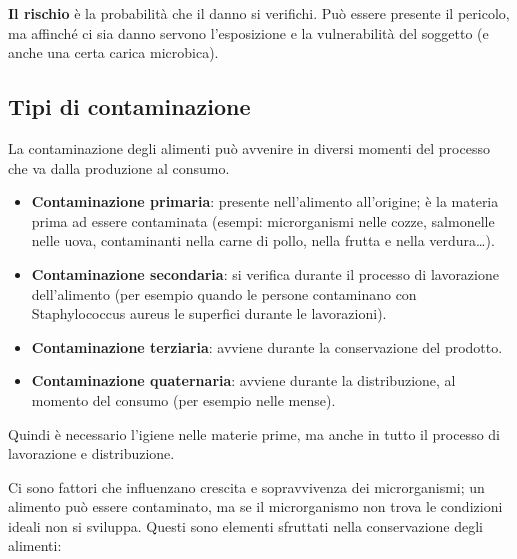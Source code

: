 \textbf{Il rischio} è la probabilità che il danno si verifichi. Può
essere presente il pericolo, ma affinché ci sia danno servono
l'esposizione e la vulnerabilità del soggetto (e anche una certa carica
microbica).

\subsection{Tipi di contaminazione}

La contaminazione degli alimenti può avvenire in diversi momenti del
processo che va dalla produzione al consumo.

\begin{itemize}
\item
  \textbf{Contaminazione primaria}: presente nell'alimento all'origine;
  è la materia prima ad essere contaminata (esempi: microrganismi nelle
  cozze, salmonelle nelle uova, contaminanti nella carne di pollo, nella
  frutta e nella verdura\ldots{}).
\item
  \textbf{Contaminazione secondaria}: si verifica durante il processo di
  lavorazione dell'alimento (per esempio quando le persone contaminano
  con Staphylococcus aureus le superfici durante le lavorazioni).
\item
  \textbf{Contaminazione terziaria}: avviene durante la conservazione
  del prodotto.
\item
  \textbf{Contaminazione quaternaria}: avviene durante la distribuzione,
  al momento del consumo (per esempio nelle mense).
\end{itemize}

Quindi è necessario l'igiene nelle materie prime, ma anche in tutto il
processo di lavorazione e distribuzione.

Ci sono fattori che influenzano crescita e sopravvivenza dei
microrganismi; un alimento può essere contaminato, ma se il
microrganismo non trova le condizioni ideali non si sviluppa. Questi
sono elementi sfruttati nella conservazione degli alimenti:

